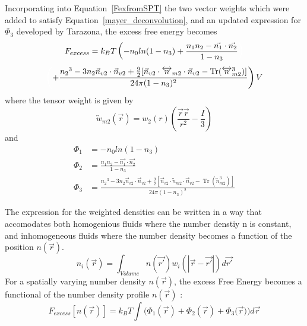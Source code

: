 \documentclass[12pt]{article}
\begin{document}
Incorporating into Equation~\ref{FexfromSPT} the two vector weights which were added to satisfy Equation~\ref{mayer_deconvolution}, and an updated expression for $\Phi_3$ developed by Tarazona, the excess free energy becomes
\begin{displaymath}{F_{excess}=k_{B}T\left(-n_{0}ln(1-n_{3})+\frac{n_{1}n_{2}-\vec{n_{1}}\cdot\vec{n_{2}}}{1-n_{3}}\color{white}\right)}\end{displaymath}
\begin{equation}{\color{white}\left(\color{black}+\frac{{n_2}^3-3n_2\vec{n}_{v2}\cdot\vec{n}_{v2}+\frac{9}{2}[\vec{n}_{v2}\cdot{\overleftrightarrow{n}_{m2}}\cdot{\vec{n}_{v2}}-\operatorname{Tr}({\overleftrightarrow{n}^3_{m2}})]}{24\pi(1-n_3)^2}\right)\color{black}V}\end{equation} 
where the tensor weight is given by
\begin{equation}{\overleftrightarrow{w}_{m2}(\vec{r})=w_2(r)\left(\frac{\vec{r}\vec{r}}{r^2}-\frac{I}{3}\right)}\end{equation} 
and
\begin{align}
\Phi_1 &= -n_{0}ln(1-n_{3}) \\
\Phi_2 &= \frac{n_{1}n_{2}-\vec{n_{1}}\cdot\vec{n_{2}}}{1-n_{3}} \\
\Phi_3 &= \frac{{n_2}^3-3n_2\vec{n}_{v2}\cdot\vec{n}_{v2}+\frac{9}{2}[\vec{n}_{v2}\cdot{\overleftrightarrow{n}_{m2}}\cdot{\vec{n}_{v2}}-\operatorname{Tr}({\overleftrightarrow{n}^3_{m2}})]}{24\pi(1-n_3)^2}  
\end{align}

The expression for the weighted densities can be written in a way that accomodates both homogenious fluids where the number denstiy n is constant, and inhomogeneous fluids where the number density becomes a function of the position $n(\vec{r})$.
\begin{equation}{n_i(\vec{r})=\int_{Volume}{n(\vec{r'})w_i(|\vec{r}-\vec{r'}|)d{\vec{r'}}}}\end{equation}
For a spatially varying number density $n(\vec{r})$, the excess Free Energy becomes a functional of the number density profile $n(\vec{r})$ :
\begin{equation}{F_{excess}[n(\vec{r})]= k_BT\int(\Phi_1(\vec{r})+\Phi_2(\vec{r})+\Phi_3(\vec{r}{)) d}\vec{r}}\end{equation} 
\end{document}
